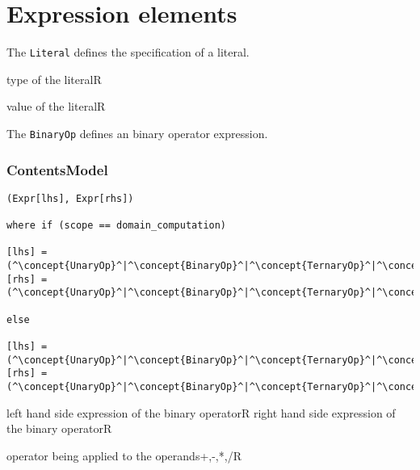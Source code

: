 \section{Expression elements}


The {\tt Literal} defines the specification of a literal.

\begin{HIRChildElements}
	{type of the literal}{R}
\end{HIRChildElements}

\begin{HIRAttributes}
	{value of the literal}{R}
\end{HIRAttributes}


The {\tt BinaryOp} defines an binary operator expression.

\subsubsection*{ContentsModel}{}

\begin{lstlisting}[style=default]
(Expr[lhs], Expr[rhs])

where if (scope == domain_computation)

[lhs] = (^\concept{UnaryOp}^|^\concept{BinaryOp}^|^\concept{TernaryOp}^|^\concept{FieldAccess}^|^\concept{VarAccess}^|^\concept{Literal}^)
[rhs] =	(^\concept{UnaryOp}^|^\concept{BinaryOp}^|^\concept{TernaryOp}^|^\concept{FieldAccess}^|^\concept{VarAccess}^|^\concept{Literal}^)

else

[lhs] = (^\concept{UnaryOp}^|^\concept{BinaryOp}^|^\concept{TernaryOp}^|^\concept{VarAccess}^|^\concept{Literal}^)
[rhs] = (^\concept{UnaryOp}^|^\concept{BinaryOp}^|^\concept{TernaryOp}^|^\concept{VarAccess}^|^\concept{Literal}^)
\end{lstlisting}


\begin{HIRChildElements}
	\HIRElementDef{[lhs]}
	{left hand side expression of the binary operator}{R}
	\HIRElementDef{[rhs]}
	{right hand side expression of the binary operator}{R}
\end{HIRChildElements}

\begin{HIRAttributesVal}
	{operator being applied to the operands}{+,-,*,/}{R}
\end{HIRAttributesVal}


